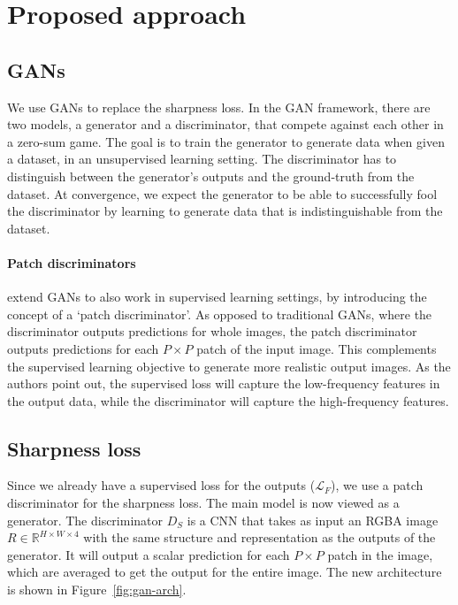 \section{Proposed approach}

\subsection{GANs}
    We use GANs to replace the sharpness loss.
    In the GAN framework, there are two models, a generator and a discriminator, that compete against each other in a zero-sum game.
    The goal is to train the generator to generate data when given a dataset, in an unsupervised learning setting.
    The discriminator has to distinguish between the generator's outputs and the ground-truth from the dataset.
    At convergence, we expect the generator to be able to successfully fool the discriminator by learning to generate data that is indistinguishable from the dataset.

    \paragraph{Patch discriminators}
    \citet{pix2pix} extend GANs to also work in supervised learning settings, by introducing the concept of a `patch discriminator'.
    As opposed to traditional GANs, where the discriminator outputs predictions for whole images, the patch discriminator outputs predictions for each $P \times P$ patch of the input image.
    This complements the supervised learning objective to generate more realistic output images.
    As the authors point out, the supervised loss will capture the low-frequency features in the output data, while the discriminator will capture the high-frequency features.

\subsection{Sharpness loss}
    Since we already have a supervised loss for the outputs ($\mathcal{L}_F$), we use a patch discriminator for the sharpness loss.
    The main model is now viewed as a generator.
    The discriminator $D_S$ is a CNN that takes as input an RGBA image $R \in \mathbb{R}^{H \times W \times 4}$ with the same structure and representation as the outputs of the generator.
    It will output a scalar prediction for each $P \times P$ patch in the image, which are averaged to get the output for the entire image.
    The new architecture is shown in Figure~\ref{fig:gan-arch}.

